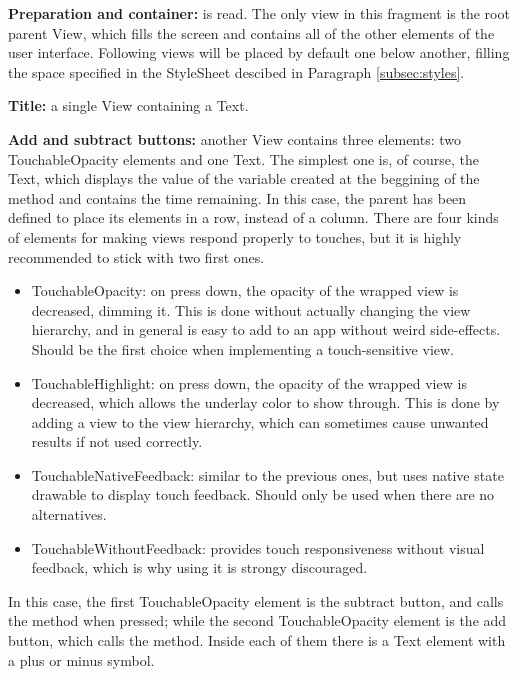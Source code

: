 \begin{description}
 \item \textbf{Preparation and container:}  is read. The only view in this fragment is the root parent View, which fills the screen and contains all of the other elements of the user interface. Following views will be placed by default one below another, filling the space specified in the StyleSheet descibed in Paragraph \ref{subsec:styles}.
 \item \textbf{Title:} a single View containing a Text. 
 \item \textbf{Add and subtract buttons:} another View contains three elements: two TouchableOpacity elements and one Text. The simplest one is, of course, the Text, which displays the value of the variable created  at the beggining of the method and contains the time remaining. In this case, the parent  has been defined to place its elements in a row, instead of a column. There are four kinds of elements for making views respond properly to touches, but it is highly recommended to stick with two first ones.
 
 \begin{itemize}
   \item TouchableOpacity: on press down, the opacity of the wrapped view is decreased, dimming it. This is done without actually changing the view hierarchy, and in general is easy to add to an app without weird side-effects. Should be the first choice when implementing a touch-sensitive view.
   \item TouchableHighlight: on press down, the opacity of the wrapped view is decreased, which allows the underlay color to show through. This is done by adding a view to the view hierarchy, which can sometimes cause unwanted results if not used correctly.
   \item TouchableNativeFeedback: similar to the previous ones, but uses native state drawable to display touch feedback. Should only be used when there are no alternatives.
   \item TouchableWithoutFeedback: provides touch responsiveness without visual feedback, which is why using it is strongy discouraged.
  \end{itemize}

 In this case, the first TouchableOpacity element is the subtract button, and calls the  method when pressed; while the second TouchableOpacity element is the add button, which calls the  method. Inside each of them there is a Text element with a plus or minus symbol.
 

\end{description}
